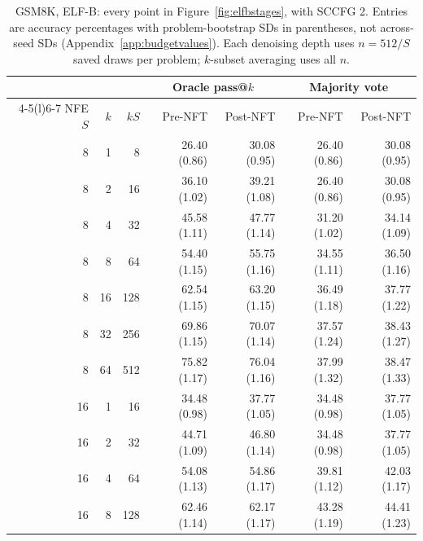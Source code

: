 \begin{table}[p]
\caption{GSM8K, ELF-B: every point in Figure~\ref{fig:elfbstages}, with SCCFG 2. Entries are accuracy percentages with problem-bootstrap SDs in parentheses, not across-seed SDs (Appendix~\ref{app:budgetvalues}). Each denoising depth uses $n=512/S$ saved draws per problem; $k$-subset averaging uses all $n$.}
\label{tab:budgetvaluesgsmb}
\centering\small
\setlength{\tabcolsep}{5pt}
\begin{tabular}{@{}rrr rrrr@{}}
\toprule
& & & \multicolumn{2}{c}{Oracle pass@$k$} & \multicolumn{2}{c}{Majority vote} \\
\cmidrule(lr){4-5}\cmidrule(l){6-7}
NFE $S$ & $k$ & $kS$ & Pre-NFT & Post-NFT & Pre-NFT & Post-NFT \\
\midrule
8 & 1 & 8 & 26.40 {\scriptsize (0.86)} & 30.08 {\scriptsize (0.95)} & 26.40 {\scriptsize (0.86)} & 30.08 {\scriptsize (0.95)} \\
8 & 2 & 16 & 36.10 {\scriptsize (1.02)} & 39.21 {\scriptsize (1.08)} & 26.40 {\scriptsize (0.86)} & 30.08 {\scriptsize (0.95)} \\
8 & 4 & 32 & 45.58 {\scriptsize (1.11)} & 47.77 {\scriptsize (1.14)} & 31.20 {\scriptsize (1.02)} & 34.14 {\scriptsize (1.09)} \\
8 & 8 & 64 & 54.40 {\scriptsize (1.15)} & 55.75 {\scriptsize (1.16)} & 34.55 {\scriptsize (1.11)} & 36.50 {\scriptsize (1.16)} \\
8 & 16 & 128 & 62.54 {\scriptsize (1.15)} & 63.20 {\scriptsize (1.15)} & 36.49 {\scriptsize (1.18)} & 37.77 {\scriptsize (1.22)} \\
8 & 32 & 256 & 69.86 {\scriptsize (1.15)} & 70.07 {\scriptsize (1.14)} & 37.57 {\scriptsize (1.24)} & 38.43 {\scriptsize (1.27)} \\
8 & 64 & 512 & 75.82 {\scriptsize (1.17)} & 76.04 {\scriptsize (1.16)} & 37.99 {\scriptsize (1.32)} & 38.47 {\scriptsize (1.33)} \\
\midrule
16 & 1 & 16 & 34.48 {\scriptsize (0.98)} & 37.77 {\scriptsize (1.05)} & 34.48 {\scriptsize (0.98)} & 37.77 {\scriptsize (1.05)} \\
16 & 2 & 32 & 44.71 {\scriptsize (1.09)} & 46.80 {\scriptsize (1.14)} & 34.48 {\scriptsize (0.98)} & 37.77 {\scriptsize (1.05)} \\
16 & 4 & 64 & 54.08 {\scriptsize (1.13)} & 54.86 {\scriptsize (1.17)} & 39.81 {\scriptsize (1.12)} & 42.03 {\scriptsize (1.17)} \\
16 & 8 & 128 & 62.46 {\scriptsize (1.14)} & 62.17 {\scriptsize (1.17)} & 43.28 {\scriptsize (1.19)} & 44.41 {\scriptsize (1.23)} \\

\end{tabular}
\end{table}
